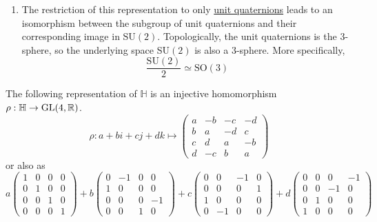 \begin{theorem}
\begin{enumerate}
\begin{equation}
        \end{equation}
      \item The restriction of this representation to only \hyperref[def:unit-quaternion]{unit quaternions} leads to an isomorphism between the subgroup of unit quaternions and their corresponding image in SU$(2)$. Topologically, the unit quaternions is the $3$-sphere, so the underlying space SU$(2)$ is also a $3$-sphere. More specifically, 
        \begin{equation}
          \frac{\text{SU}(2)}{2} \simeq \text{SO}(3)
        \end{equation}
    \end{enumerate}
  \end{theorem}

  \begin{theorem}
    \label{thm:real-matrix-representation-of-h}
  The following representation of $\mathbb{H}$ is an injective homomorphism $\rho: \mathbb{H} \to \operatorname{GL}(4, \mathbb{R})$. 
  \begin{equation}
    \rho: a+bi+cj+dk \mapsto \begin{pmatrix}
    a&-b&-c&-d \\
    b&a&-d&c\\
    c&d&a&-b\\
    d&-c&b&a
    \end{pmatrix}
  \end{equation}
  or also as
  \begin{equation}
    a \begin{pmatrix}
    1 &0 &0 &0 \\
    0& 1&0&0\\
    0&0&1&0\\
    0&0&0&1
    \end{pmatrix} + b \begin{pmatrix}
    0&-1&0&0\\1&0&0&0\\0&0&0&-1\\0&0&1&0
    \end{pmatrix} + c\begin{pmatrix}
    0&0&-1&0\\0&0&0&1\\1&0&0&0\\0&-1&0&0
    \end{pmatrix} + d \begin{pmatrix}
    0&0&0&-1\\0&0&-1&0\\0&1&0&0\\1&0&0&0

\end{pmatrix}
\end{equation}
\end{theorem}
